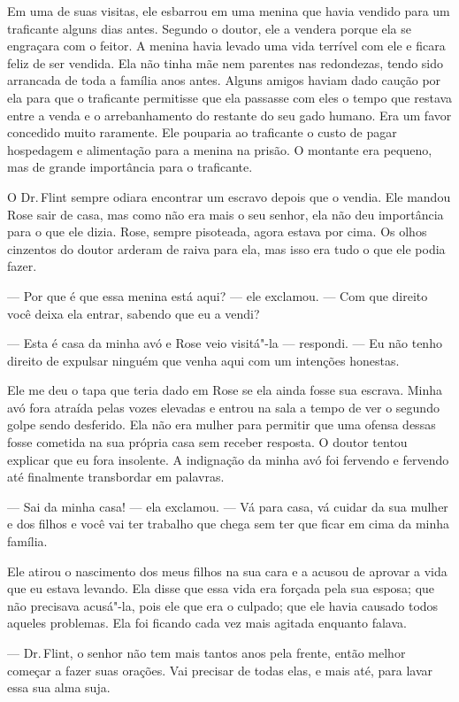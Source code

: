Em uma de suas visitas, ele esbarrou em
uma menina que havia vendido para um traficante alguns dias antes.
Segundo o doutor, ele a vendera porque ela se engraçara com o feitor. A
menina havia levado uma vida terrível com ele e ficara feliz de ser
vendida. Ela não tinha mãe nem parentes nas redondezas, tendo sido
arrancada de toda a família anos antes. Alguns amigos haviam dado caução
por ela para que o traficante permitisse que ela passasse com eles o
tempo que restava entre a venda e o arrebanhamento do restante do seu
gado humano. Era um favor concedido muito raramente. Ele pouparia ao
traficante o custo de pagar hospedagem e alimentação para a menina na
prisão. O montante era pequeno, mas de grande importância para o
traficante.

O Dr.\,Flint sempre odiara encontrar um
escravo depois que o vendia. Ele mandou Rose sair de casa, mas como não
era mais o seu senhor, ela não deu importância para o que ele dizia.
Rose, sempre pisoteada, agora estava por cima. Os olhos cinzentos do
doutor arderam de raiva para ela, mas isso era tudo o que ele podia
fazer.

--- Por que é que essa menina está aqui? --- ele exclamou. --- Com que
direito você deixa ela entrar, sabendo que eu a vendi?

--- Esta é casa da minha avó e Rose
veio visitá"-la --- respondi. --- Eu não tenho direito de expulsar
ninguém que venha aqui com um intenções honestas.

Ele me deu o tapa que teria dado em
Rose se ela ainda fosse sua escrava. Minha avó fora atraída pelas vozes
elevadas e entrou na sala a tempo de ver o segundo golpe sendo
desferido. Ela não era mulher para permitir que uma ofensa dessas fosse
cometida na sua própria casa sem receber resposta. O doutor tentou
explicar que eu fora insolente. A indignação da minha avó foi fervendo e
fervendo até finalmente transbordar em palavras.

--- Sai da minha casa! --- ela exclamou. --- Vá para casa, vá cuidar da
sua mulher e dos filhos e você vai ter trabalho que chega sem ter que
ficar em cima da minha família.

Ele atirou o nascimento dos meus filhos
na sua cara e a acusou de aprovar a vida que eu estava levando. Ela
disse que essa vida era forçada pela sua esposa; que não precisava
acusá"-la, pois ele que era o culpado; que ele havia causado todos
aqueles problemas. Ela foi ficando cada vez mais agitada enquanto
falava.

--- Dr.\,Flint, o senhor não tem mais tantos anos pela frente, então
melhor começar a fazer suas orações. Vai precisar de todas elas, e mais
até, para lavar essa sua alma suja.

